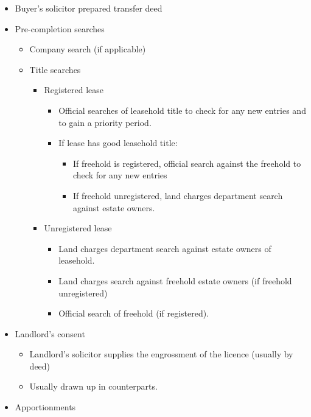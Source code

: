 \documentclass[
]{article}
\providecommand{\tightlist}{%
  \setlength{\itemsep}{0pt}\setlength{\parskip}{0pt}}
\begin{document}
\begin{itemize}
\tightlist
\item
  Buyer's solicitor prepared transfer deed
\item
  Pre-completion searches

  \begin{itemize}
  \tightlist
  \item
    Company search (if applicable)
  \item
    Title searches

    \begin{itemize}
    \tightlist
    \item
      Registered lease

      \begin{itemize}
      \tightlist
      \item
        Official searches of leasehold title to check for any new
        entries and to gain a priority period.
      \item
        If lease has good leasehold title:

        \begin{itemize}
        \tightlist
        \item
          If freehold is registered, official search against the
          freehold to check for any new entries
        \item
          If freehold unregistered, land charges department search
          against estate owners.
        \end{itemize}
      \end{itemize}
    \item
      Unregistered lease

      \begin{itemize}
      \tightlist
      \item
        Land charges department search against estate owners of
        leasehold.
      \item
        Land charges search against freehold estate owners (if freehold
        unregistered)
      \item
        Official search of freehold (if registered).
      \end{itemize}
    \end{itemize}
  \end{itemize}
\item
  Landlord's consent

  \begin{itemize}
  \tightlist
  \item
    Landlord's solicitor supplies the engrossment of the licence
    (usually by deed)
  \item
    Usually drawn up in counterparts.
  \end{itemize}
\item
  Apportionments


\end{itemize}
\end{document}
